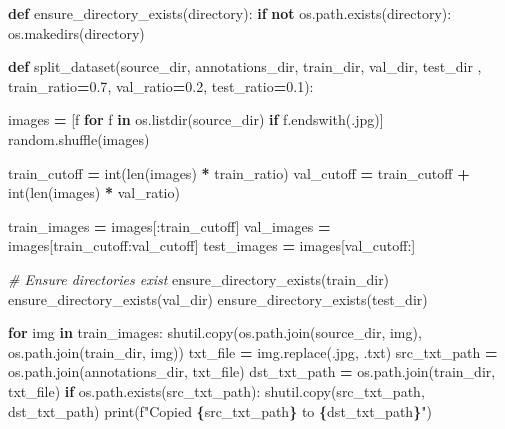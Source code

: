 \documentclass[
  10pt,
]{article}
\newenvironment{Shaded}{\begin{snugshade}}{\end{snugshade}}
\newcommand{\BuiltInTok}[1]{#1}
\newcommand{\CommentTok}[1]{\textcolor[rgb]{0.56,0.35,0.01}{\textit{#1}}}
\newcommand{\ControlFlowTok}[1]{\textcolor[rgb]{0.13,0.29,0.53}{\textbf{#1}}}
\newcommand{\FloatTok}[1]{\textcolor[rgb]{0.00,0.00,0.81}{#1}}
\newcommand{\KeywordTok}[1]{\textcolor[rgb]{0.13,0.29,0.53}{\textbf{#1}}}
\newcommand{\NormalTok}[1]{#1}
\newcommand{\OperatorTok}[1]{\textcolor[rgb]{0.81,0.36,0.00}{\textbf{#1}}}
\newcommand{\SpecialCharTok}[1]{\textcolor[rgb]{0.81,0.36,0.00}{\textbf{#1}}}
\newcommand{\SpecialStringTok}[1]{\textcolor[rgb]{0.31,0.60,0.02}{#1}}
\newcommand{\StringTok}[1]{\textcolor[rgb]{0.31,0.60,0.02}{#1}}
\begin{document}
\begin{Shaded}
\begin{Highlighting}[]
\KeywordTok{def}\NormalTok{ ensure\_directory\_exists(directory):}
    \ControlFlowTok{if} \KeywordTok{not}\NormalTok{ os.path.exists(directory):}
\NormalTok{        os.makedirs(directory)}

\KeywordTok{def}\NormalTok{ split\_dataset(source\_dir, annotations\_dir, train\_dir, val\_dir, test\_dir}
\NormalTok{                          , train\_ratio}\OperatorTok{=}\FloatTok{0.7}\NormalTok{, val\_ratio}\OperatorTok{=}\FloatTok{0.2}\NormalTok{, test\_ratio}\OperatorTok{=}\FloatTok{0.1}\NormalTok{):}

\NormalTok{    images }\OperatorTok{=}\NormalTok{ [f }\ControlFlowTok{for}\NormalTok{ f }\KeywordTok{in}\NormalTok{ os.listdir(source\_dir) }\ControlFlowTok{if}\NormalTok{ f.endswith(}\StringTok{\textquotesingle{}.jpg\textquotesingle{}}\NormalTok{)]}
\NormalTok{    random.shuffle(images)}

\NormalTok{    train\_cutoff }\OperatorTok{=} \BuiltInTok{int}\NormalTok{(}\BuiltInTok{len}\NormalTok{(images) }\OperatorTok{*}\NormalTok{ train\_ratio)}
\NormalTok{    val\_cutoff }\OperatorTok{=}\NormalTok{ train\_cutoff }\OperatorTok{+} \BuiltInTok{int}\NormalTok{(}\BuiltInTok{len}\NormalTok{(images) }\OperatorTok{*}\NormalTok{ val\_ratio)}

\NormalTok{    train\_images }\OperatorTok{=}\NormalTok{ images[:train\_cutoff]}
\NormalTok{    val\_images }\OperatorTok{=}\NormalTok{ images[train\_cutoff:val\_cutoff]}
\NormalTok{    test\_images }\OperatorTok{=}\NormalTok{ images[val\_cutoff:]}

    \CommentTok{\# Ensure directories exist}
\NormalTok{    ensure\_directory\_exists(train\_dir)}
\NormalTok{    ensure\_directory\_exists(val\_dir)}
\NormalTok{    ensure\_directory\_exists(test\_dir)}

    \ControlFlowTok{for}\NormalTok{ img }\KeywordTok{in}\NormalTok{ train\_images:}
\NormalTok{        shutil.copy(os.path.join(source\_dir, img), os.path.join(train\_dir, img))}
\NormalTok{        txt\_file }\OperatorTok{=}\NormalTok{ img.replace(}\StringTok{\textquotesingle{}.jpg\textquotesingle{}}\NormalTok{, }\StringTok{\textquotesingle{}.txt\textquotesingle{}}\NormalTok{)}
\NormalTok{        src\_txt\_path }\OperatorTok{=}\NormalTok{ os.path.join(annotations\_dir, txt\_file)}
\NormalTok{        dst\_txt\_path }\OperatorTok{=}\NormalTok{ os.path.join(train\_dir, txt\_file)}
        \ControlFlowTok{if}\NormalTok{ os.path.exists(src\_txt\_path):}
\NormalTok{            shutil.copy(src\_txt\_path, dst\_txt\_path)}
            \BuiltInTok{print}\NormalTok{(}\SpecialStringTok{f"Copied }\SpecialCharTok{\{}\NormalTok{src\_txt\_path}\SpecialCharTok{\}}\SpecialStringTok{ to }\SpecialCharTok{\{}\NormalTok{dst\_txt\_path}\SpecialCharTok{\}}\SpecialStringTok{"}\NormalTok{)}


\end{Highlighting}
\end{Shaded}
\end{document}
